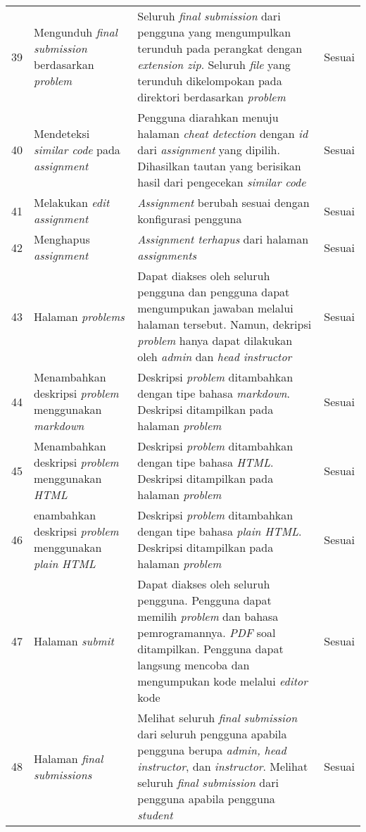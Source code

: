 \begin{longtable}[H]{|p{0.5cm}| p{5.5cm}| p{6cm}| p{2.5cm}|}
39 & Mengunduh \textit{final submission} berdasarkan \textit{problem} & Seluruh \textit{final submission} dari pengguna yang mengumpulkan terunduh pada perangkat dengan \textit{extension zip}. Seluruh \textit{file} yang terunduh dikelompokan pada direktori berdasarkan \textit{problem} & Sesuai\\ \cline{1-4}
40 & Mendeteksi \textit{similar code} pada \textit{assignment} & Pengguna diarahkan menuju halaman \textit{cheat detection} dengan \textit{id} dari \textit{assignment} yang dipilih. Dihasilkan tautan yang berisikan hasil dari pengecekan \textit{similar code} & Sesuai\\ \cline{1-4}
41 & Melakukan \textit{edit assignment} & \textit{Assignment} berubah sesuai dengan konfigurasi pengguna & Sesuai\\ \cline{1-4}
42 & Menghapus \textit{assignment} & \textit{Assignment terhapus} dari halaman \textit{assignments} & Sesuai\\ \cline{1-4}
43 & Halaman \textit{problems} & Dapat diakses oleh seluruh pengguna dan pengguna dapat mengumpukan jawaban melalui halaman tersebut. Namun, dekripsi \textit{problem} hanya dapat dilakukan oleh \textit{admin} dan \textit{head instructor} & Sesuai\\ \cline{1-4}
44 & Menambahkan deskripsi \textit{problem} menggunakan \textit{markdown} & Deskripsi \textit{problem} ditambahkan dengan tipe bahasa \textit{markdown}. Deskripsi ditampilkan pada halaman \textit{problem} & Sesuai\\ \cline{1-4}
45 & Menambahkan deskripsi \textit{problem} menggunakan \textit{HTML} & Deskripsi \textit{problem} ditambahkan dengan tipe bahasa \textit{HTML}. Deskripsi ditampilkan pada halaman \textit{problem} & Sesuai\\ \cline{1-4}
46 & enambahkan deskripsi \textit{problem} menggunakan \textit{plain HTML} & Deskripsi \textit{problem} ditambahkan dengan tipe bahasa \textit{plain HTML}. Deskripsi ditampilkan pada halaman \textit{problem} & Sesuai\\ \cline{1-4}
47 & Halaman \textit{submit} & Dapat diakses oleh seluruh pengguna. Pengguna dapat memilih \textit{problem} dan bahasa pemrogramannya. \textit{PDF} soal ditampilkan. Pengguna dapat langsung mencoba dan mengumpukan kode melalui \textit{editor} kode & Sesuai\\ \cline{1-4}
48 & Halaman \textit{final submissions} & Melihat seluruh \textit{final submission} dari seluruh pengguna apabila pengguna berupa \textit{admin, head instructor}, dan \textit{instructor}. Melihat seluruh \textit{final submission} dari pengguna apabila pengguna \textit{student} & Sesuai\\ \cline{1-4}

\end{longtable}
